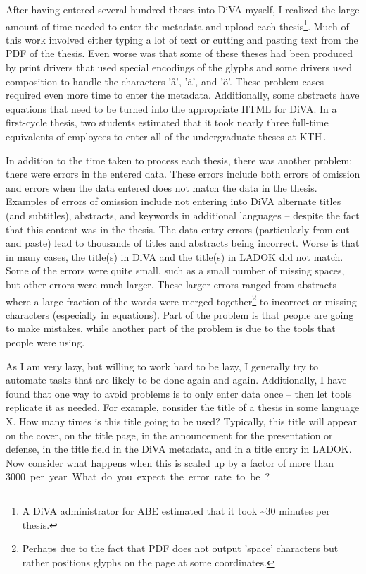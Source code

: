 \documentclass[12pt, twoside]{article}
\begin{document}
After having entered several hundred theses into \gls{DiVA} myself, I realized the large amount of time needed to enter the metadata and upload each thesis\footnote{A DiVA administrator for ABE estimated that it took \textasciitilde 30 minutes per thesis.}. Much of this work involved either typing a lot of text or cutting and pasting text from the PDF of the thesis. Even worse was that some of these theses had been produced by print drivers that used special encodings of the glyphs and some drivers used composition to handle the characters 'å', 'ä', and 'ö'. These problem cases required even more time to enter the metadata. Additionally, some abstracts have equations that need to be turned into the appropriate HTML for \gls{DiVA}. In a first-cycle thesis, two students estimated that it took nearly three full-time equivalents of employees to enter all of the undergraduate theses at \gls{KTH}\,\cite{BesharatPour_and_Li_2019}.

In addition to the time taken to process each thesis, there was another problem: there were errors in the entered data. These errors include both errors of omission and errors when the data entered does not match the data in the thesis. Examples of errors of omission include not entering into \gls{DiVA} alternate titles (and subtitles), abstracts, and keywords in additional languages -- despite the fact that this content was in the thesis. The data entry errors (particularly from cut and paste) lead to thousands of titles and abstracts being incorrect. Worse is that in many cases, the title(s) in \gls{DiVA} and the title(s) in \gls{LADOK} did not match. Some of the errors were quite small, such as a small number of missing spaces, but other errors were much larger. These larger errors ranged from abstracts where a large fraction of the words were merged together\footnote{Perhaps due to the fact that PDF does not output 'space' characters but rather positions glyphs on the page at some coordinates.} to incorrect or missing characters (especially in equations). Part of the problem is that people are going to make mistakes, while another part of the problem is due to the tools that people were using.

As I am very lazy, but willing to work hard to be lazy, I generally try to automate tasks that are likely to be done again and again. Additionally, I have found that one way to avoid problems is to only enter data once -- then let tools replicate it as needed. For example, consider the title of a thesis in some language X. How many times is this title going to be used? Typically, this title will appear on the cover, on the title page, in the announcement for the presentation or defense, in the title field in the \gls{DiVA} metadata, and in a title entry in \gls{LADOK}. Now consider what happens when this is scaled up by a factor of more than \qty{3000} per year. What do you expect the error rate to be?
\end{document}
